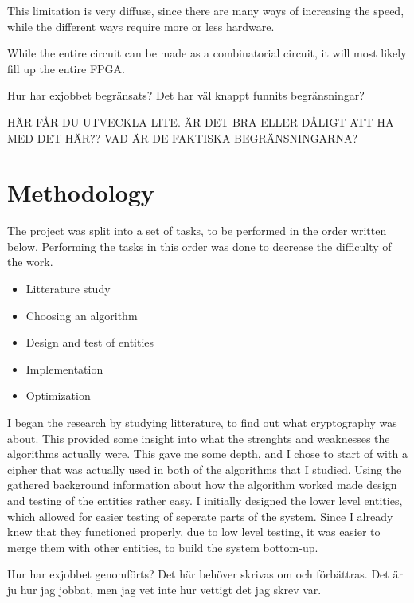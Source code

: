This limitation is very diffuse, since there are many 
ways of increasing the speed, while the different ways require more or 
less hardware.


While the entire circuit can be made as a combinatorial circuit, it 
will most likely fill up the entire FPGA.

Hur har exjobbet begränsats? Det har väl knappt funnits begränsningar?

HÄR FÅR DU UTVECKLA LITE. ÄR DET BRA ELLER DÅLIGT ATT HA MED DET HÄR?? 
VAD ÄR DE FAKTISKA BEGRÄNSNINGARNA?

\section{Methodology}
The project was split into a set of tasks, to be performed in the order 
written below. Performing the tasks in this order was done to decrease 
the difficulty of the work.

\begin{itemize}
\item Litterature study
\item Choosing an algorithm
\item Design and test of entities
\item Implementation
\item Optimization
\end{itemize}

I began the research by studying litterature, to find out what 
cryptography was about. This provided some insight into what the 
strenghts and weaknesses the algorithms actually were. This gave me 
some depth, and I chose to start of with a cipher that was actually 
used in both of the algorithms that I studied. Using the gathered 
background information about how the algorithm worked made design 
and testing of the entities rather easy. I initially designed the lower
level entities, which allowed for easier testing of seperate parts of 
the system. Since I already knew that they functioned properly, due to 
low level testing, it was easier to merge them with other entities, to 
build the system bottom-up. 

Hur har exjobbet genomförts? Det här behöver skrivas om och förbättras. 
Det är ju hur jag jobbat, men jag vet inte hur vettigt det jag skrev 
var.

